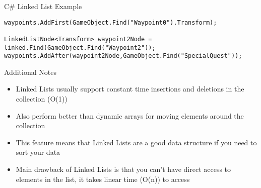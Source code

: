\begin{frame}[fragile]{C\# Linked List
	Example}
\begin{lstlisting}
waypoints.AddFirst(GameObject.Find("Waypoint0").Transform);

LinkedListNode<Transform> waypoint2Node = linked.Find(GameObject.Find("Waypoint2"));
waypoints.AddAfter(waypoint2Node,GameObject.Find("SpecialQuest"));
\end{lstlisting}
\end{frame}


\begin{frame}{Additional Notes}
	\begin{itemize}
		\pause \item Linked Lists usually support constant time insertions and deletions in the collection (O(1))
		\pause \item Also perform better than dynamic arrays for moving elements around the collection
		\pause \item This feature means that Linked Lists are a good data structure if you need to sort your data
		\pause \item Main drawback of Linked Lists is that you can't have direct access to elements in the list, it takes linear time (O(n)) to access
	\end{itemize}
\end{frame}